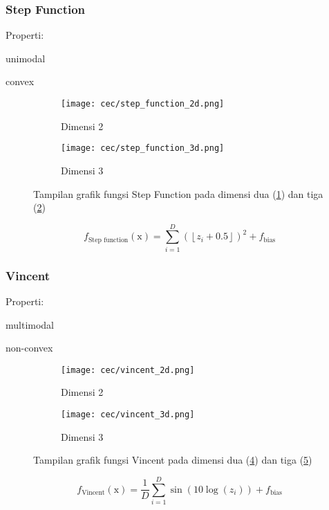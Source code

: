 \subsubsection{Step Function}
\noindent Properti:
\begin{packed_item}
  \item unimodal
  \item convex
\end{packed_item}
\begin{figure}[H]
	\centering
	\begin{subfigure}[b]{0.4\textwidth}
		\centering
		\texttt{[image: cec/step\_function\_2d.png]}
		\caption{Dimensi 2}
		\label{fig:step-2d}
	\end{subfigure}
	\hfill
	\begin{subfigure}[b]{0.4\textwidth}
		\centering
		\texttt{[image: cec/step\_function\_3d.png]}
		\caption{Dimensi 3}
		\label{fig:step-3d}
	\end{subfigure}
	\caption{Tampilan grafik fungsi Step Function pada dimensi dua (\cref{fig:step-2d}) dan tiga (\cref{fig:step-3d})}
	\label{fig:step-function}
\end{figure}
\begin{equation}
  f_{\text{Step function}}(\mathrm{x})=\sum_{i=1}^{D}\left(\left\lfloor z_i + 0.5 \right\rfloor \right)^2+f_{\text{bias}}
\end{equation}

\subsubsection{Vincent}
\noindent Properti:
\begin{packed_item}
  \item multimodal
  \item non-convex
\end{packed_item}
\begin{figure}[H]
	\centering
	\begin{subfigure}[b]{0.4\textwidth}
		\centering
		\texttt{[image: cec/vincent\_2d.png]}
		\caption{Dimensi 2}
		\label{fig:vincent-2d}
	\end{subfigure}
	\hfill
	\begin{subfigure}[b]{0.4\textwidth}
		\centering
		\texttt{[image: cec/vincent\_3d.png]}
		\caption{Dimensi 3}
		\label{fig:vincent-3d}
	\end{subfigure}
	\caption{Tampilan grafik fungsi Vincent pada dimensi dua (\cref{fig:vincent-2d}) dan tiga (\cref{fig:vincent-3d})}
	\label{fig:vincent}
\end{figure}
\begin{equation}
  f_{\text{Vincent}}(\mathrm{x})=\frac{1}{D}\sum_{i=1}^{D}\sin\left(10 \log\left(z_i \right)  \right) +f_{\text{bias}}
\end{equation}

